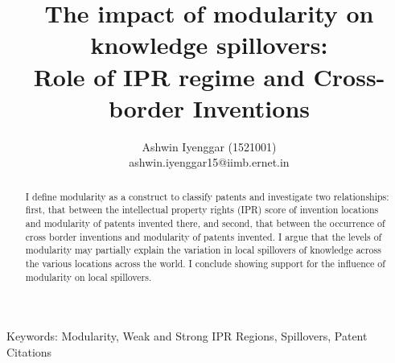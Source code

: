 \documentclass[12pt]{article}
\begin{document}
\title{\LARGE The impact of modularity on knowledge spillovers:\\ \Large Role of IPR regime and Cross-border Inventions}
\author{Ashwin Iyenggar  (1521001) \\ ashwin.iyenggar15@iimb.ernet.in} 
\large

\maketitle
\thispagestyle{empty}

\begin{abstract}
\large I define modularity as a construct to classify patents and investigate two relationships: first, that between the intellectual property rights (IPR) score of invention locations and modularity of patents invented there, and second, that between the occurrence of cross border inventions and modularity of patents invented. I argue that the levels of modularity may partially explain the variation in local spillovers of knowledge across the various locations across the world. I conclude showing support for the influence of modularity on local spillovers.
\end{abstract}
{Keywords:} Modularity, Weak and Strong IPR Regions, Spillovers, Patent Citations
\doublespacing
\end{document}
